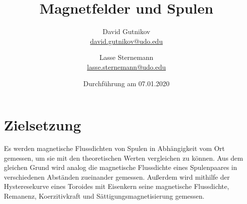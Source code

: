 \documentclass[titlepage = firstcover]{scrartcl}
\title{Magnetfelder und Spulen}
\author{
  David Gutnikov\\
  \href{mailto:david.gutnikov@udo.edu}{david.gutnikov@udo.edu}
 \and 
  Lasse Sternemann\\
  \href{mailto:lasse.sternemann@udo.edu}{lasse.sternemann@udo.edu}
}
\date{Durchführung am 07.01.2020}
\begin{document}
    \maketitle
    \newpage
    \tableofcontents
    \newpage

    \section{Zielsetzung}
      Es werden magnetische Flussdichten von Spulen in Abhängigkeit vom Ort gemessen, um sie mit den theoretischen Werten vergleichen zu können. Aus dem
      gleichen Grund wird analog die magnetische Flussdichte eines Spulenpaares in verschiedenen Abständen zueinander gemessen. Außerdem wird mithilfe der
      Hysteresekurve eines Toroides mit Eisenkern seine magnetische Flussdichte, Remanenz, Koerzitivkraft und Sättigungsmagnetisierung gemessen.
\end{document}
